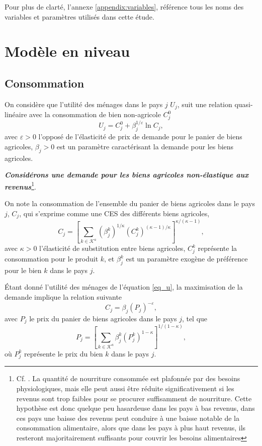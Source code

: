 Pour plus de clarté, l’annexe \ref{appendix:variables}, référence tous les noms des variables et paramètres utilisés dans cette étude.

\section{Modèle en niveau}
\subsection{Consommation}

On considère que l’utilité des ménages dans le pays $j$ $U_j$, suit une relation quasi-linéaire avec la consommation de bien non-agricole $C_j^0$
\begin{equation}\label{eq_u}
    U_j = C_j^0 + \beta_j^{1/\varepsilon} \ln C_j,
\end{equation}
avec $\varepsilon > 0$ l’opposé de l'élasticité de prix de demande pour le panier de biens agricoles, $\beta_j > 0$ est un paramètre caractérisant la demande pour les biens agricoles.

\textbf{\textit{Considérons une demande pour les biens agricoles non-élastique aux revenus}}\footnote{Cf. \cite{Comin2021}. La quantité de nourriture consommée est plafonnée par des besoins physiologiques, mais elle peut aussi être réduite significativement si les revenus sont trop faibles pour se procurer suffisamment de nourriture. Cette hypothèse est donc quelque peu hasardeuse dans les pays à bas revenus, dans ces pays une baisse des revenus peut conduire à une baisse notable de la consommation alimentaire, alors que dans les pays à plus haut revenus, ils resteront majoritairement suffisants pour couvrir les besoins alimentaires}.

On note la consommation de l’ensemble du panier de biens agricoles dans le pays $j$, $C_j$, qui s’exprime comme une CES des différents biens agricoles,
\begin{equation}\label{eq_cj1}
    C_j = \left[ \sum_{k \in \mathcal{K}^a} (\beta_{j}^k)^{1/\kappa} (C_{j}^k)^{(\kappa-1)/\kappa} \right]^{\kappa/(\kappa-1)},
\end{equation}
avec $\kappa > 0$ l’élasticité de substitution entre biens agricoles, $C_j^k$ représente la consommation pour le produit $k$, et $\beta_{j}^k$ est un paramètre exogène de préférence pour le bien $k$ dans le pays $j$.

Étant donné l’utilité des ménages de l’équation \ref{eq_u}, la maximisation de la demande implique la relation suivante
\begin{equation}\label{eq_pj}
    C_j = \beta_j (P_j)^{-\varepsilon},
\end{equation}
avec $P_j$ le prix du panier de biens agricoles dans le pays $j$, tel que
\begin{equation}\label{eq_cj}
    P_j = \left[ \sum_{k \in \mathcal{K}^a} \beta_{j}^k (P_{j}^k)^{1-\kappa} \right]^{1/(1-\kappa)},
\end{equation}
où $P_j^k$ représente le prix du bien $k$ dans le pays $j$.

